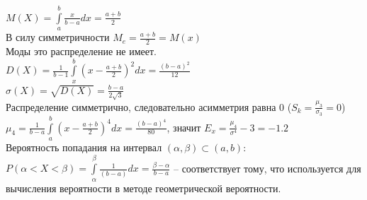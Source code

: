 \documentclass[russian, 12pt, fleqn]{article}
\begin{document}
$M(X) = \int\limits_{a}^{b}\frac{x}{b-a}dx = \frac{a + b}{2}$\\
В силу симметричности $M_e= \frac{a+b}{2} = M(x)$\\
Моды это распределение не имеет.\\
$D(X) = \frac{1}{b - 1} \int\limits_{x}^b(x - \frac{a + b}{2})^2dx = \frac{(b - a)^2}{12}$\\
$\sigma(X) = \sqrt{D(X)} = \frac{b - a}{2\sqrt{3}}$\\
Распределение симметрично, следовательно асимметрия равна 0 ($S_k = \frac{\mu_3}{\sigma_3} = 0$)\\
$\mu_4 = \frac{1}{b - a} \int\limits_{a}^{b}(x - \frac{a + b}{2})^4dx = \frac{(b - a)^4}{80}$, значит $E_x = \frac{\mu_4}{\sigma^4} - 3 = -1.2$\\
Вероятность попадания на интервал $(\alpha, \beta) \subset (a, b)$:\\
$P(\alpha<X<\beta) = \int\limits_{\alpha}^{\beta} \frac{1}{(b - a)}dx = \frac{\beta - \alpha}{b - a}$ -- соответствует тому, что используется для вычисления вероятности в методе геометрической вероятности.\\
\end{document}
